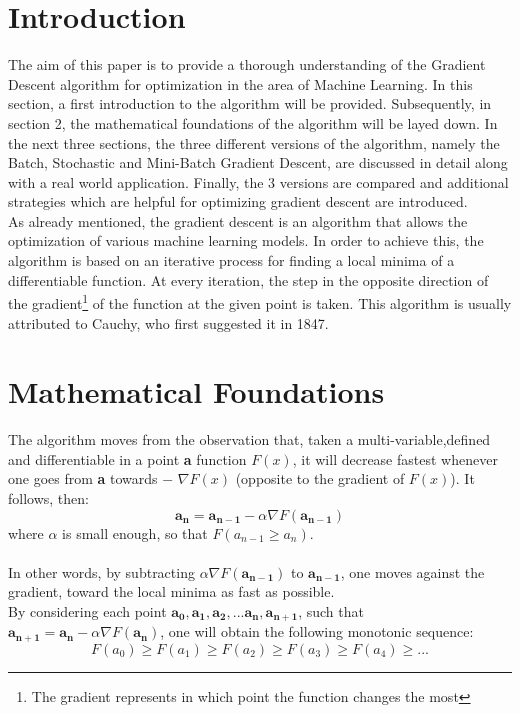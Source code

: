\documentclass[conference]{IEEEtran}
\begin{document}
\section{Introduction}

The aim of this paper is to provide a thorough understanding of the Gradient Descent algorithm for optimization in the area of Machine Learning. In this section, a first introduction to the algorithm will be provided. Subsequently, in section 2, the mathematical foundations of the algorithm will be layed down. In the next three sections, the three different versions of the algorithm, namely the Batch, Stochastic and Mini-Batch Gradient Descent, are discussed in detail along with a real world application. Finally, the 3 versions are compared and additional strategies which are helpful for optimizing gradient descent are introduced. 
\\
As already mentioned, the gradient descent is an algorithm that allows the optimization of various machine learning models. In order to achieve this, the algorithm is based on an iterative process for finding a local minima of a differentiable function. At every iteration, the step in the opposite direction of the gradient\footnote{ The gradient represents in which point the function changes the most}  of the function at the given point is taken. 
This algorithm is usually attributed to Cauchy, who first suggested it in 1847.




\section{Mathematical Foundations}


The algorithm moves from the observation that, taken a multi-variable,defined and differentiable in a point \textbf{a} function $F(x)$, it will decrease fastest whenever one goes from \textbf{a}  towards $-$ $\nabla F(x)$  (opposite to the gradient of $F(x)$).
It follows, then:
\begin{equation}
    \mathbf{a_{n}} = \mathbf{a_{n-1}} - \alpha\nabla F(\mathbf{a_{n-1}})\label{eq:original}
\end{equation}
where $\alpha$ is small enough, so that $F(a_{n-1} \geq a_{n})$.\\\\
In other words, by subtracting $\alpha\nabla F(\mathbf{a_{n-1}})$ to $\mathbf{a_{n-1}}$, one moves against the gradient, toward the local minima as fast as possible. \\By considering each point $\mathbf{a_{0}},\mathbf{a_{1}},\mathbf{a_{2}},...\mathbf{a_{n},\mathbf{a_{n+1}}}$, such that 
$\mathbf{a_{n+1}} = \mathbf{a_{n}} - \alpha\nabla F(\mathbf{a_{n}})$, one will obtain the following monotonic sequence:
\[
   F(a_{0}) \geq F(a_{1})\geq F(a_{2})\geq F(a_{3})\geq F(a_{4}) \geq ...
\]
\end{document}
